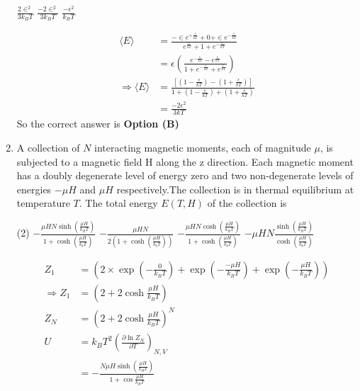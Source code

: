 \begin{enumerate}
\begin{tasks}
\task[\textbf{A.}] $\frac{2 \in^{2}}{3 k_{B} T}$
\task[\textbf{B.}] $\frac{-2 \in^{2}}{3 k_{B} T}$
\task[\textbf{C.}] $\frac{-\epsilon^{2}}{k_{B} T}$
\end{tasks}
\begin{answer}
\begin{align*}
\langle E\rangle&=\frac{-\in e^{+\frac{\epsilon}{k T}}+0+\in e^{-\frac{\epsilon}{k T}}}{e^{\frac{\epsilon}{k T}}+1+e^{-\frac{\epsilon}{k T}}}\\&=\epsilon\left(\frac{e^{-\frac{\epsilon}{k T}}-e^{\frac{\epsilon}{k T}}}{1+e^{-\frac{\epsilon}{k T}}+e^{\frac{\epsilon}{k T}}}\right)\\
\Rightarrow\langle E\rangle&=\frac{\left[\left(1-\frac{\epsilon}{k T}\right)-\left(1+\frac{\epsilon}{k T}\right)\right]}{1+\left(1-\frac{\epsilon}{k T}\right)+\left(1+\frac{\epsilon}{k T}\right)}\\&=\frac{-2 \epsilon^{2}}{3 k T}
\end{align*}
So the correct answer is \textbf{Option (B)}
\end{answer}	
\item A collection of $N$ interacting magnetic moments, each of magnitude $\mu$, is subjected to a magnetic field $\mathrm{H}$ along the $\mathrm{z}$ direction. Each magnetic moment has a doubly degenerate level of energy zero and two non-degenerate levels of energies $-\mu H$ and $\mu H$ respectively.The collection is in thermal equilibrium at temperature $T$. The total energy $E(T, H)$ of the collection is
{}
\begin{tasks}(2)
\task[\textbf{A.}] $-\frac{\mu H N \sinh \left(\frac{\mu H}{k_{B} T}\right)}{1+\cosh \left(\frac{\mu H}{k_{b} T}\right)}$
\task[\textbf{B.}] $-\frac{\mu H N}{2\left(1+\cosh \left(\frac{\mu H}{k_{b} T}\right)\right)}$
\task[\textbf{C.}] $-\frac{\mu H N \cosh \left(\frac{\mu H}{k_{B} T}\right)}{1+\cosh \left(\frac{\mu H}{k_{b} T}\right)}$
\task[\textbf{D.}] $-\mu H N \frac{\sinh \left(\frac{\mu H}{k_{B} T}\right)}{\cosh \left(\frac{\mu H}{k_{b} T}\right)}$
\end{tasks}
\begin{answer}
\begin{align*}
Z_{1}&=\left(2 \times \exp \left(-\frac{0}{k_{B} T}\right)+\exp \left(-\frac{-\mu H}{k_{B} T}\right)+\exp \left(-\frac{\mu H}{k_{B} T}\right)\right) \\\Rightarrow Z_{1}&=\left(2+2 \cosh \frac{\mu H}{k_{B} T}\right)\\
Z_{N}&=\left(2+2 \cosh \frac{\mu H}{k_{B} T}\right)^{N}\\U&=k_{B} T^{2}\left(\frac{\partial \ln Z_{N}}{\partial T}\right)_{N, V}\\&=-\frac{N \mu H \sinh \left(\frac{\mu H}{k_{B} T}\right)}{1+\cos \frac{\mu H}{k_{B} T}}

\end{align*}
\end{answer}
\end{enumerate}
